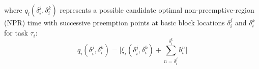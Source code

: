 \newline
\noindent
where \begin{math}q_{i}(\delta_{i}^{j},\delta_{i}^{k})\end{math} represents a possible candidate optimal non-preemptive-region (NPR) time with successive preemption points at basic block locations \begin{math}\delta_{i}^{j}\end{math} and \begin{math}\delta_{i}^{k}\end{math} for task \begin{math}\tau_{i}\end{math}:
\begin{equation}\label{eqn:mthnpr-time}
   q_{i}(\delta_{i}^{j},\delta_{i}^{k}) = \Big[\xi_{i}(\delta_{i}^{j},\delta_{i}^{k}) + \sum_{n=\delta_{i}^{j}}^{\delta_{i}^{k}}b_{i}^{n}\Big]
\end{equation}


